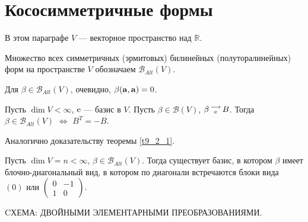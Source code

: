 

\section{Кососимметричные формы}

В этом параграфе $V$ --- векторное пространство над $\mathbb{R}$.




Множество всех симметричных (эрмитовых) билинейных (полуторалинейных) форм на пространстве $V$ обозначаем 
$\mathcal{B}_{Alt}(V)$.

\otstup

Для $\beta \in \mathcal{B}_{Alt}(V)$, очевидно,
 $\beta (\mathbf{a}, \mathbf{a}) = 0$. 


\begin{theor}\label{t9_2_1111}
Пусть $\dim V<\infty$, $\mathrm{e}$ --- базис в $V$. Пусть $\beta \in  \mathcal{B}(V)$, $\beta \begin{smallmatrix} \longrightarrow \\ \mathrm{e} \end{smallmatrix} B$.
Тогда $\beta\in \mathcal{B}_{Alt}(V)$ $\Leftrightarrow$ $B^{T}=-B$.%
\end{theor}
\dok Аналогично доказательству теоремы \ref{t9_2_1}.
\edok





\begin{theor}\label{t9_3_1111}
Пусть $\dim V=n<\infty$,  $\beta\in \mathcal{B}_{Alt}(V)$. 
Тогда существует базис, в котором $\beta$ имеет блочно-диагональный вид, в котором по диагонали
встречаются блоки вида  \\$(0)$ или 
$\begin{pmatrix} 0 & -1 \\ 
1& 0
\end{pmatrix}.$
\end{theor}
\dok CХЕМА: ДВОЙНЫМИ ЭЛЕМЕНТАРНЫМИ ПРЕОБРАЗОВАНИЯМИ.
\edok
